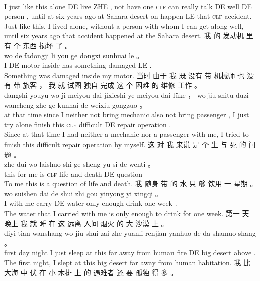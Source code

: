 \documentclass[UTF8]{ctexart}
\begin{document}
\begin{exe}
\\
I just {like this} alone DE live ZHE , {not have} one \textsc{clf} can really talk DE {well} DE person , until at six years ago at Sahara desert on happen LE that \textsc{clf} accident. 
\\
\trans Just like this, I lived alone, without a person with whom I can get along well, until six years ago that accident happened at the Sahara desert. 
\ex
\glll
我 的 发动机 里 有 个 东西 损坏 了 。
\\
wo de fadongji li you ge dongxi sunhuai le 。
\\
I DE motor inside has something damaged LE .
\\
\trans Something was damaged inside my motor. 
\ex
\glll
当时 由于 我 既 没有 带 机械师 也 没有 带 旅客 ， 我 就 试图 独自 完成 这 个 困难 的 维修 工作 。
\\
dangshi youyu wo ji meiyou dai jixieshi ye meiyou dai l\"{u}ke ， wo jiu shitu duzi wancheng zhe ge kunnai de weixiu gongzuo 。
\\
{at that time} since I neither not bring mechanic also not bring passenger , I just try alone finish this \textsc{clf} difficult DE repair operation .
\\
\trans Since at that time I had neither a mechanic nor a passenger with me, I tried to finish this difficult repair operation by myself. 
\ex
\glll
这 对 我 来说 是 个 生 与 死 的 问题 。
\\
zhe dui wo laishuo shi ge sheng yu si de wenti 。
\\
this for me {} is \textsc{clf} life and death DE question
\\
\trans To me this is a question of life and death. 
\ex
\glll
我 随身 带 的 水 只 够 饮用 一 星期 。
\\
wo suishen dai de shui zhi gou yinyong yi xingqi 。
\\
I {with me} carry DE water only enough drink one week .
\\
\trans The water that I carried with me is only enough to drink for one week. 
\ex
\glll
第一 天 晚上 我 就 睡 在 这 远离 人间 烟火 的 大 沙漠 上 。
\\
diyi tian wanshang wo jiu shui zai zhe yuanli renjian yanhuo de da shamuo shang 。
\\
first day night I just sleep at this {far away from} human fire DE big desert above .
\\
\trans The first night, I slept at this big desert far away from human habitation.
\ex
\glll
我 比 大海 中 伏 在 小 木排 上 的 遇难者 还 要 孤独 得 多 。

\end{exe}
\end{document}
